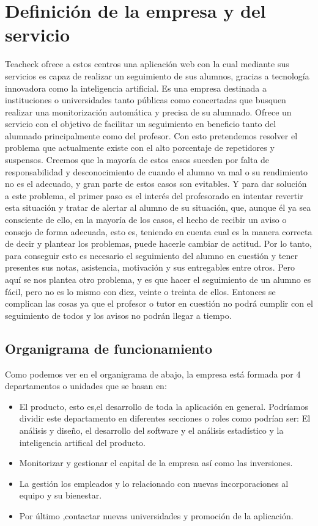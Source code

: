 \section{Definición de la empresa y del servicio}
Teacheck ofrece a estos centros una aplicación web con la cual mediante sus servicios es capaz de realizar un seguimiento de sus alumnos, gracias a tecnología innovadora como la inteligencia artificial.
Es una empresa destinada a instituciones o universidades tanto públicas como concertadas que busquen realizar una monitorización automática y precisa de su alumnado. Ofrece un servicio con el objetivo de facilitar un seguimiento en beneficio tanto del alumnado principalmente como del profesor. Con esto pretendemos resolver el problema que actualmente existe con el alto porcentaje de repetidores y suspensos. Creemos que la mayoría de estos casos suceden por falta de responsabilidad y desconocimiento de cuando el alumno va mal o su rendimiento no es el adecuado, y gran parte de estos casos son evitables. Y para dar solución a este problema, el primer paso es el interés del profesorado en intentar revertir esta situación y tratar de alertar al alumno de su situación, que, aunque él ya sea consciente de ello, en la mayoría de los casos, el hecho de recibir un aviso o consejo de forma adecuada, esto es, teniendo en cuenta cual es la manera correcta de decir y plantear los problemas, puede hacerle cambiar de actitud. Por lo tanto, para conseguir esto es necesario el seguimiento del alumno en cuestión y tener presentes sus notas, asistencia, motivación y sus entregables entre otros. Pero aquí se nos plantea otro problema, y es que hacer el seguimiento de un alumno es fácil, pero no es lo mismo con diez, veinte o treinta de ellos. Entonces se complican las cosas ya que el profesor o tutor en cuestión no podrá cumplir con el seguimiento de todos y los avisos no podrán llegar a tiempo. 
\subsection{Organigrama de funcionamiento}
Como podemos ver en el organigrama de abajo, la empresa está formada por 4 departamentos o unidades que se basan en:
\begin{itemize}
\item{El producto, esto es,el desarrollo de toda la aplicación en general. Podríamos dividir este departamento en diferentes secciones o roles como podrían ser: El análisis y diseño, el desarrollo del software y el análisis estadístico y la inteligencia artifical del producto.}
\item{Monitorizar y gestionar el capital de la empresa así como las inversiones.}
\item{La gestión los empleados y lo relacionado con nuevas incorporaciones al equipo y su bienestar.}
\item{Por último ,contactar nuevas universidades y promoción de la aplicación.}
\end{itemize}
\subparagraph{}

